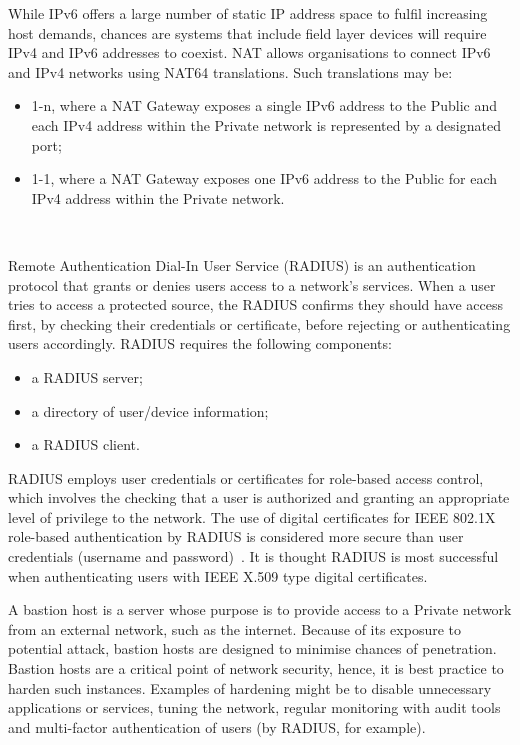 \documentclass[11pt, oneside]{book}   	%
\begin{document}
While IPv6 offers a large number of static IP address space to fulfil increasing host demands, chances are systems that include field layer devices will require IPv4 and IPv6 addresses to coexist.
NAT allows organisations to connect IPv6 and IPv4 networks using NAT64 translations. Such translations may be:
\begin{itemize}
	\item 1-n, where a NAT Gateway exposes a single IPv6 address to the Public and each IPv4 address within the Private network is represented by a designated port; 
	\item 1-1, where a NAT Gateway exposes one IPv6 address to the Public for each IPv4 address within the Private network.
\end{itemize}\

Remote Authentication Dial-In User Service (RADIUS) is an authentication protocol that grants or denies users access to a network’s services.
When a user tries to access a protected source, the RADIUS confirms they should have access first, by checking their credentials or certificate, before rejecting or authenticating users accordingly.
RADIUS requires the following components:
\begin{itemize}
	\item a RADIUS server; 
	\item a directory of user/device information;
	\item a RADIUS client.
\end{itemize}	
RADIUS employs user credentials or certificates for role-based access control, which involves the checking that a user is authorized and granting an appropriate level of privilege to the network.
The use of digital certificates for IEEE 802.1X role-based authentication by RADIUS is considered more secure than user credentials (username and password)~\cite{8021X}.
It is thought RADIUS is most successful when authenticating users with IEEE X.509 type digital certificates.~\cite{X509}\

A bastion host is a server whose purpose is to provide access to a Private network from an external network, such as the internet.
Because of its exposure to potential attack, bastion hosts are designed to minimise chances of penetration.
Bastion hosts are a critical point of network security, hence, it is best practice to harden such instances.
Examples of hardening might be to disable unnecessary applications or services, tuning the network, regular monitoring with audit tools and multi-factor authentication of users (by RADIUS, for example).\
\end{document}
